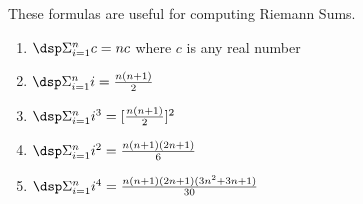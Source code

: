 \setcounter{dfn}{0}
\setcounter{prb}{0}
\setcounter{axm}{0}
\setcounter{expl}{0}
\setcounter{lem}{0}
\setcounter{thm}{0}

These formulas are useful for computing Riemann Sums.
\begin{enumerate}
\item $\dsp \Sigma_{i=1}^{n} c = nc$ where $c$ is any real number
\item $\dsp \Sigma_{i=1}^{n} i = \frac{n(n+1)}{2}$
\item $\dsp \Sigma_{i=1}^{n} i^{3} = [\frac{n(n+1)}{2}]^{2}$
\item $\dsp \Sigma_{i=1}^{n} i^{2} = \frac{n(n+1)(2n+1)}{6}$
\item $\dsp \Sigma_{i=1}^{n} i^{4} = \frac{n(n+1)(2n+1)(3n^{2}+3n+1)}{30}$
\end{enumerate}

